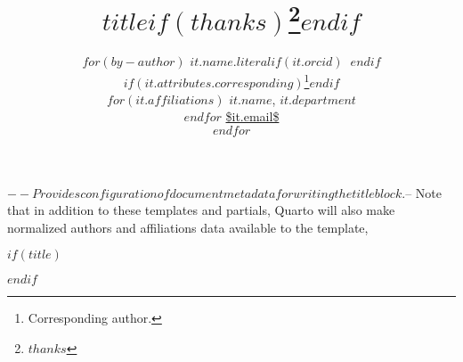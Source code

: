 $-- Provides configuration of document metadata for writing the title block.
$-- Note that in addition to these templates and partials, Quarto will also make normalized authors and affiliations data available to the template,

$if(title)$
\title{$title$$if(thanks)$\thanks{$thanks$}$endif$}
$endif$

\author{
$for(by-author)$
{\bfseries \normalsize $it.name.literal$$if(it.orcid)$~$endif$}%
$if(it.attributes.corresponding)$\thanks{Corresponding author.}$endif$ \\%
$for(it.affiliations)$ \small $it.name$, $it.department$ \\$endfor$%
{\footnotesize \url{$it.email$}} \\\vspace{10pt}
$endfor$
}

\predate{}
\postdate{}
\date{}
